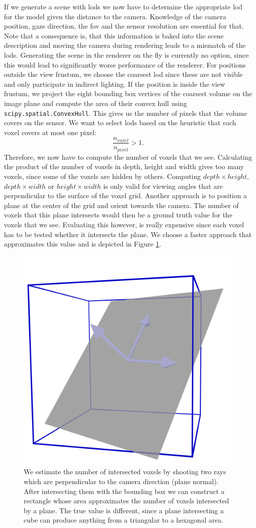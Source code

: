 If we generate a scene with \acsp{lod} we now have to determine the appropriate \ac{lod} for the model given the distance to the camera.
Knowledge of the camera position, gaze direction, the \ac{fov} and the sensor resolution are essential for that.
Note that a consequence is, that this information is baked into the scene description and moving the camera during rendering leads to a mismatch of the \acp{lod}.
Generating the scene in the renderer on the fly is currently no option, since this would lead to significantly worse performance of the renderer.
For positions outside the view frustum, we choose the coarsest \ac{lod} since these are not visible and only participate in indirect lighting.
If the position is inside the view frustum, we project the eight bounding box vertices of the coarsest volume on the image plane and compute the area of their convex hull using \texttt{scipy.spatial.ConvexHull}.
This gives us the number of pixels that the volume covers on the sensor.
We want to select \acp{lod} based on the heuristic that each voxel covers at most one pixel:
\begin{equation*}
    \frac{n_{voxel}}{n_{pixel}} > 1.
\end{equation*}
Therefore, we now have to compute the number of voxels that we see.
Calculating the product of the number of voxels in depth, height and width gives too many voxels, since some of the voxels are hidden by others.
Computing $depth \times height$, $depth \times width$ or $height \times width$ is only valid for viewing angles that are perpendicular to the surface of the voxel grid.
Another approach is to position a plane at the center of the grid and orient towards the camera.
The number of voxels that this plane intersects would then be a ground truth value for the voxels that we see.
Evaluating this however, is really expensive since each voxel has to be tested whether it intersects the plane.
We choose a faster approach that approximates this value and is depicted in Figure \ref{fig:voxel_estimation}.
\begin{figure}[ht]
    \centering
    \includegraphics[width=0.3\linewidth]{img/voxel_estimation.png}
    \caption[Estimation of intersected voxels]{We estimate the number of intersected voxels by shooting two rays which are perpendicular to the camera direction (plane normal). After intersecting them with the bounding box we can construct a rectangle whose area approximates the number of voxels intersected by a plane. The true value is different, since a plane intersecting a cube can produce anything from a triangular to a hexagonal area.}
    \label{fig:voxel_estimation}
\end{figure}

